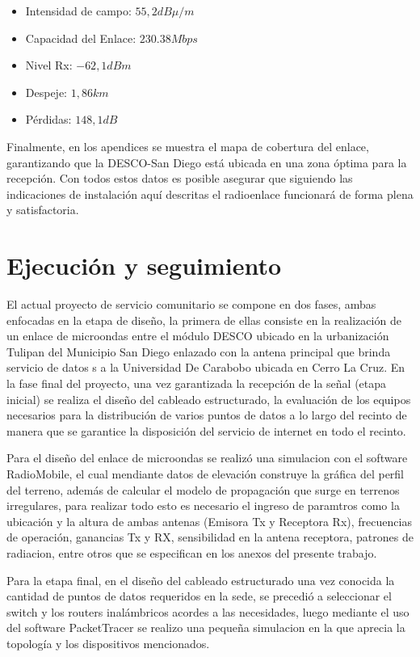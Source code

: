\documentclass[11pt, a4paper, twosides]{report}
\begin{document}
\begin{itemize}
\item Intensidad de campo: $55, 2dB\mu/m$
\item Capacidad del Enlace: $230.38 Mbps$
\item Nivel Rx: $-62,1dBm$
\item Despeje: $1, 86km$
\item Pérdidas: $148,1dB$
\end{itemize}

Finalmente, en los apendices se muestra el mapa de cobertura del enlace, garantizando que la DESCO-San Diego está ubicada en una zona óptima para la recepción. Con todos estos datos es posible asegurar que siguiendo las indicaciones de instalación aquí descritas el radioenlace funcionará de forma plena y satisfactoria.


\chapter{Ejecución y seguimiento}
El  actual proyecto de servicio comunitario se compone en dos fases, ambas enfocadas en la etapa de diseño, la primera de ellas consiste en la realización de un enlace de microondas entre el módulo DESCO ubicado en la urbanización Tulipan del Municipio San Diego enlazado con  la antena principal que brinda servicio de datos s a la Universidad De Carabobo ubicada en Cerro La Cruz. En la fase final del proyecto, una vez garantizada la recepción de la señal (etapa inicial) se realiza el diseño del cableado estructurado, la evaluación de los equipos necesarios para la distribución de varios puntos de datos a lo largo del recinto de manera que se garantice la  disposición del servicio de internet en todo el recinto. 

Para el diseño del enlace de microondas se realizó una  simulacion con el software RadioMobile, el cual mendiante datos de elevación construye la gráfica del perfil del terreno, además de calcular el modelo de propagación que surge en terrenos irregulares, para realizar todo esto es necesario el ingreso de paramtros como la ubicación y la altura de ambas antenas (Emisora Tx y Receptora Rx), frecuencias de operación, ganancias Tx y RX, sensibilidad en la antena receptora, patrones de radiacion, entre otros que se especifican en los anexos del presente trabajo.

Para la etapa final, en el diseño del cableado estructurado una vez conocida la cantidad de puntos de datos requeridos en la sede, se precedió a seleccionar el switch y los routers inalámbricos acordes a las necesidades, luego mediante el uso del software PacketTracer se realizo una pequeña simulacion en la que aprecia la topología y los dispositivos mencionados.
\end{document}
